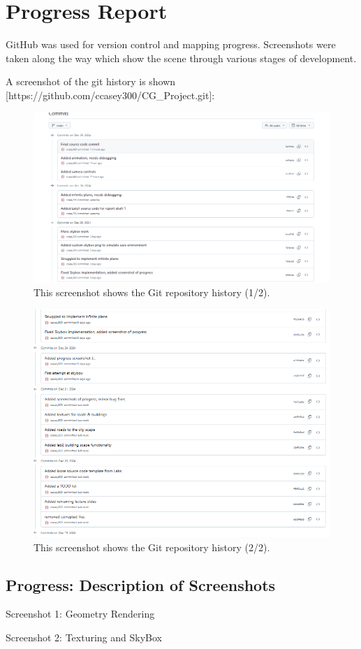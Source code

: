 \chapter{Progress Report}

GitHub was used for version control and mapping progress. Screenshots were taken along the way which show the scene through various stages of development.

A screenshot of the git history is shown [https://github.com/ccasey300/CG_Project.git]:

\begin{figure}
    \centering
    \includegraphics[width=0.5\linewidth]{Results//Progress_screenshots/Git History 2 (top of page)}
    \caption{This screenshot shows the  Git repository history (1/2).}
\end{figure}

\begin{figure}
    \centering
    \includegraphics[width=0.5\linewidth]{Results//Progress_screenshots/Git History 1}
    \caption{This screenshot shows the  Git repository history (2/2).}
\end{figure}

\newpage
\section*{\Huge{Progress: Description of Screenshots}}

Screenshot 1: Geometry Rendering

Screenshot 2: Texturing and SkyBox

